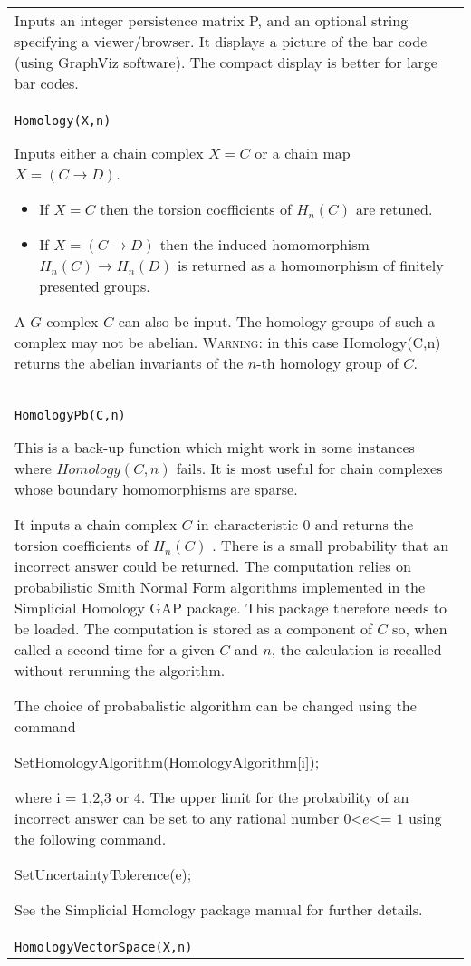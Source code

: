 \documentclass[a4paper,11pt]{report}
\begin{document}
{\begin{center}
\begin{tabular}{|l|}
 Inputs an integer persistence matrix P, and an optional string specifying a
viewer/browser. It displays a picture of the bar code (using GraphViz
software). The compact display is better for large bar codes. \\
 \index{Homology} \texttt{Homology(X,n)} 

 Inputs either a chain complex $X=C$ or a chain map $X=(C \longrightarrow D)$. 
\begin{itemize}
\item If $X=C$ then the torsion coefficients of $H_n(C)$ are retuned.
\item  If $X=(C \longrightarrow D)$ then the induced homomorphism $H_n(C) \longrightarrow H_n(D)$ is returned as a homomorphism of finitely presented groups. 
\end{itemize}
 A $G$-complex $C$ can also be input. The homology groups of such a complex may not be abelian. \textsc{Warning:} in this case Homology(C,n) returns the abelian invariants of the $n$-th homology group of $C$. \\
 \index{HomologyPb} \texttt{HomologyPb(C,n)} 

 This is a back-up function which might work in some instances where $Homology(C,n)$ fails. It is most useful for chain complexes whose boundary homomorphisms are
sparse. 

 It inputs a chain complex $C$ in characteristic $0$ and returns the torsion coefficients of $H_n(C)$ . There is a small probability that an incorrect answer could be returned. The
computation relies on probabilistic Smith Normal Form algorithms implemented
in the Simplicial Homology GAP package. This package therefore needs to be
loaded. The computation is stored as a component of $C$ so, when called a second time for a given $C$ and $n$, the calculation is recalled without rerunning the algorithm. 

 The choice of probabalistic algorithm can be changed using the command 

 SetHomologyAlgorithm(HomologyAlgorithm[i]);

 where i = 1,2,3 or 4. The upper limit for the probability of an incorrect
answer can be set to any rational number $0${\textless}$e${\textless}= $1$ using the following command. 

SetUncertaintyTolerence(e);

 See the Simplicial Homology package manual for further details. \\
 \index{HomologyVectorSpace} \texttt{HomologyVectorSpace(X,n)} 


\end{tabular}
\end{center}}
\end{document}
